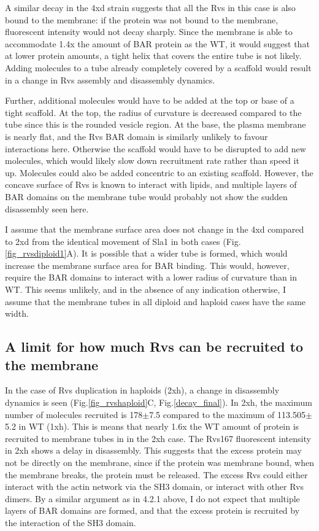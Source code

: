 	\vspace{5mm}
A similar decay in the 4xd strain suggests that all the Rvs in this case is also bound to the membrane: if the protein was not bound to the membrane, fluorescent intensity would not decay sharply. Since the membrane is able to accommodate 1.4x the amount of BAR protein as the WT, it would suggest that at lower protein amounts, a tight helix that covers the entire tube is not likely. Adding molecules to a tube already completely covered by a scaffold would result in a change in Rvs assembly and disassembly dynamics. 

	\vspace{5mm}
Further, additional molecules would have to be added at the top or base of a tight scaffold. At the top, the radius of curvature is decreased compared to the tube since this is the rounded vesicle region. At the base, the plasma membrane is nearly flat, and the Rvs BAR domain is similarly unlikely to favour interactions here. Otherwise the scaffold would have to be disrupted to add new molecules, which would likely slow down recruitment rate rather than speed it up. Molecules could also be added concentric to an existing scaffold. However, the concave surface of Rvs is known to interact with lipids, and multiple layers of BAR domains on the membrane tube would probably not show the sudden disassembly seen here.  

	\vspace{5mm}
I assume that the membrane surface area does not change in the 4xd compared to 2xd from the identical movement of Sla1 in both cases (Fig.\ref{fig_rvsdiploid1}A). It is possible that a wider tube is formed, which would increase the membrane surface area for BAR binding. This would, however, require the BAR domains to interact with a lower radius of curvature than in WT. This seems unlikely, and in the absence of any indication otherwise, I assume that the membrane tubes in all diploid and haploid cases have the same width.


\subsection{A limit for how much Rvs can be recruited to the membrane}
In the case of Rvs duplication in haploids (2xh), a change in disassembly dynamics is seen (Fig.\ref{fig_rvshaploid}C, Fig.\ref{decay_final}). In 2xh, the maximum number of molecules recruited is 178$\pm$7.5 compared to the maximum of 113.505$\pm$5.2 in WT (1xh). This is means that nearly 1.6x the WT amount of protein is recruited to membrane tubes in in the 2xh case. The Rvs167 fluorescent intensity in 2xh shows a delay in disassembly. This suggests that the excess protein may not be directly on the membrane, since if the protein was membrane bound, when the membrane breaks, the protein must be released. The excess Rvs could either interact with the actin network via the SH3 domain, or interact with other Rvs dimers. By a similar argument as in 4.2.1 above, I do not expect that multiple layers of BAR domains are formed, and that the excess protein is recruited by the interaction of the SH3 domain. 


